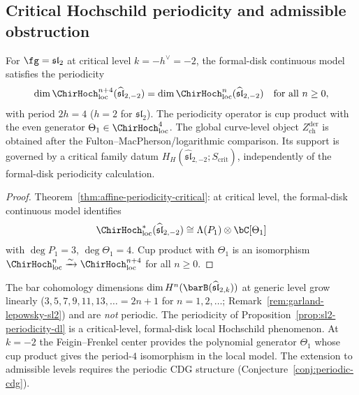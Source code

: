 \subsection{Critical Hochschild periodicity and admissible obstruction}

\begin{proposition}
\label{prop:sl2-periodicity-dl}
For $\fg = \mathfrak{sl}_2$ at critical level $k = -h^\vee = -2$, the
formal-disk continuous model satisfies the periodicity
\begin{equation}\label{eq:sl2-periodicity}
\dim \ChirHoch_{\mathrm{loc}}^{n+4}(\widehat{\mathfrak{sl}}_{2,-2})
= \dim \ChirHoch_{\mathrm{loc}}^n(\widehat{\mathfrak{sl}}_{2,-2})
\quad
\text{for all } n \geq 0,
\end{equation}
with period $2h = 4$ \textup{(}$h = 2$ for $\mathfrak{sl}_2$\textup{)}.
The periodicity operator is cup product with the even generator
$\Theta_1 \in \ChirHoch_{\mathrm{loc}}^4$. The global curve-level
object $Z^{\mathrm{der}}_{\mathrm{ch}}$ is obtained after the
Fulton--MacPherson/logarithmic comparison.  Its support is governed by
a critical family datum $H_H(\widehat{\mathfrak{sl}}_{2,-2};
S_{\mathrm{crit}})$, independently of the formal-disk periodicity
calculation.
\end{proposition}

\begin{proof}
Theorem~\ref{thm:affine-periodicity-critical}: at critical level, the
formal-disk continuous model identifies
\[
\ChirHoch_{\mathrm{loc}}^*(\widehat{\mathfrak{sl}}_{2,-2})
\cong
\Lambda(P_1) \otimes \bC[\Theta_1]
\]
with $\deg P_1 = 3$,
$\deg \Theta_1 = 4$. Cup product with $\Theta_1$ is an isomorphism
$\ChirHoch_{\mathrm{loc}}^n \xrightarrow{\sim}
\ChirHoch_{\mathrm{loc}}^{n+4}$ for all $n \geq 0$.
\end{proof}

\begin{remark}
\label{rem:bar-vs-hochschild-periodicity}
The bar cohomology dimensions $\dim H^n(\barB(\widehat{\mathfrak{sl}}_{2,k}))$
at generic level grow linearly \textup{(}$3, 5, 7, 9, 11, 13, \ldots = 2n{+}1$
for $n = 1, 2, \ldots$; Remark~\textup{\ref{rem:garland-lepowsky-sl2}}\textup{)} and are \emph{not} periodic.
The periodicity of Proposition~\ref{prop:sl2-periodicity-dl} is a
critical-level, formal-disk local Hochschild phenomenon. At $k = -2$
the Feigin--Frenkel center provides the polynomial generator
$\Theta_1$ whose cup product gives the period-$4$ isomorphism in the
local model. The extension to admissible levels requires the periodic
CDG structure \textup{(}Conjecture~\ref{conj:periodic-cdg}\textup{)}.
\end{remark}

